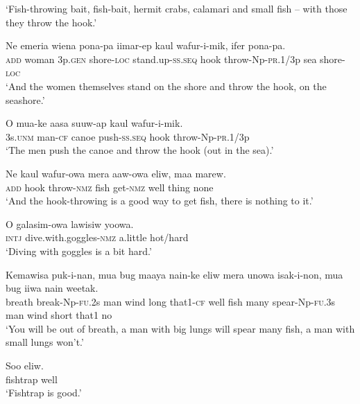 \glt ‘Fish-throwing bait, fish-bait, hermit crabs, calamari and small fish – with those they throw the hook.’ \\
\z


\ea
\gll  Ne  emeria  wiena  pona-pa  iimar-ep       kaul  wafur-i-mik,  ifer  pona-pa. \\
\textsc{add}  woman  3p.\textsc{gen}  shore-\textsc{loc}  stand.up-\textsc{ss.seq}   hook  throw-Np-\textsc{pr}.1/3p  sea  shore-\textsc{loc} \\


\glt ‘And the women themselves stand on the shore and throw the hook, on the seashore.’ \\
\z


\ea
\gll  O  mua-ke  aasa  suuw-ap  kaul  wafur-i-mik. \\
3s.\textsc{unm}  man-\textsc{cf}  canoe  push-\textsc{ss.seq}  hook  throw-Np-\textsc{pr}.1/3p \\
\glt ‘The men push the canoe and throw the hook (out in the sea).’ \\
\z


\ea
\gll  Ne  kaul  wafur-owa  mera  aaw-owa  eliw,  maa  marew. \\
\textsc{add}  hook  throw-\textsc{nmz}  fish  get-\textsc{nmz}  well  thing  none \\
\glt ‘And the hook-throwing is a good way to get fish, there is nothing to it.’ \\
\z


\ea
\gll  O  galasim-owa  lawisiw  yoowa. \\
\textsc{intj}  dive.with.goggles-\textsc{nmz}  a.little  hot/hard \\
\glt ‘Diving with goggles is a bit hard.’ \\
\z


\ea
\gll  Kemawisa  puk-i-nan,  mua  bug  maaya  nain-ke  eliw  mera  unowa  isak-i-non,  mua  bug  iiwa  nain  weetak. \\
breath  break-Np-\textsc{fu}.2s  man  wind  long  that1-\textsc{cf}  well     fish  many  spear-Np-\textsc{fu}.3s  man  wind  short  that1  no \\


\glt ‘You will be out of breath, a man with big lungs will spear many fish, a man with small lungs won’t.’ \\
\z


\ea
\gll  Soo  eliw. \\
fishtrap  well \\
\glt ‘Fishtrap is good.’ \\
\z


